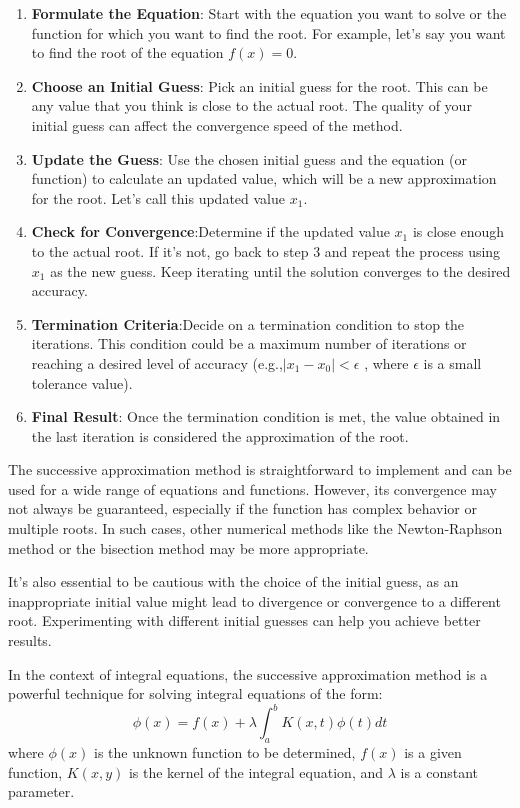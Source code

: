 \documentclass[]{article}
\begin{document}
\begin{enumerate}[itemsep=10pt]
    \item \textbf{Formulate the Equation}: Start with the equation you want to solve or the function for which you want to find the root. For example, let's say you want to find the root of the equation $f(x)=0$.
    \item \textbf{Choose an Initial Guess}: Pick an initial guess for the root. This can be any value that you think is close to the actual root. The quality of your initial guess can affect the convergence speed of the method.
    \item \textbf{Update the Guess}: Use the chosen initial guess and the equation (or function) to calculate an updated value, which will be a new approximation for the root. Let's call this updated value $x_1$.
    \item \textbf{Check for Convergence}:Determine if the updated value $x_1$ is close enough to the actual root. If it's not, go back to step 3 and repeat the process using $x_1$ as the new guess. Keep iterating until the solution converges to the desired accuracy.
    \item \textbf{Termination Criteria}:Decide on a termination condition to stop the iterations. This condition could be a maximum number of iterations or reaching a desired level of accuracy (e.g.,$|x_1-x_0|<\epsilon$ , where $\epsilon$ is a small tolerance value).
    \item \textbf{Final Result}: Once the termination condition is met, the value obtained in the last iteration is considered the approximation of the root.
\end{enumerate}
The successive approximation method is straightforward to implement and can be used for a wide range of equations and functions. However, its convergence may not always be guaranteed, especially if the function has complex behavior or multiple roots. In such cases, other numerical methods like the Newton-Raphson method or the bisection method may be more appropriate.

It's also essential to be cautious with the choice of the initial guess, as an inappropriate initial value might lead to divergence or convergence to a different root. Experimenting with different initial guesses can help you achieve better results.

In the context of integral equations, the successive approximation method is a powerful technique for solving integral equations of the form:
\[
\phi(x) = f(x) + \lambda\int_{a}^{b} K(x,t) \phi(t)dt    
\]
where $\phi(x)$ is the unknown function to be determined,
$f(x)$  is a given function, $K(x,y)$ is the kernel of the integral equation,
and $\lambda$ is a constant parameter.
\end{document}
